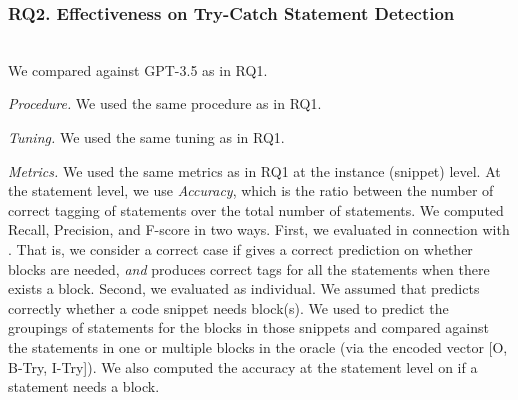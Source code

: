 \subsubsection{RQ2. Effectiveness on Try-Catch Statement Detection}~\\
 We compared {\xstate} against GPT-3.5 as in RQ1.


{\em Procedure.} We used the same procedure as in RQ1.

{\em Tuning.} We used the same tuning as in RQ1.

{\em Metrics.} We used the same metrics as in RQ1 at the instance (snippet)
level.  At the statement level, we use {\em Accuracy}, which is the
ratio between the number of correct tagging of statements over the
total number of statements. We computed Recall, Precision,
and F-score in two ways. First, we evaluated {\xstate} in connection
with {\xblock}. That is, we consider a correct case if {\xblock} gives
a correct prediction on whether
 blocks are needed, {\em and} {\xstate} produces
correct tags for all the statements when there exists
a  block. Second, we evaluated {\xstate} as
individual. We assumed that {\xblock} predicts correctly whether a
code snippet needs  block(s). We used {\xstate} to
predict the groupings of statements for the blocks in those snippets
and compared against the statements in one or multiple blocks in the oracle (via
the encoded vector [O, B-Try, I-Try]). We also computed the accuracy
at the statement level on if a statement needs a 
block.




